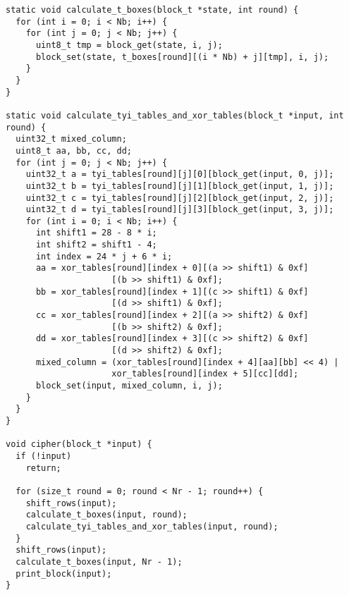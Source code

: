 \documentclass[a4paper, 10pt]{article}
\begin{document}
  \scriptsize{
    \begin{verbatim}
static void calculate_t_boxes(block_t *state, int round) {
  for (int i = 0; i < Nb; i++) {
    for (int j = 0; j < Nb; j++) {
      uint8_t tmp = block_get(state, i, j);
      block_set(state, t_boxes[round][(i * Nb) + j][tmp], i, j);
    }
  }
}

static void calculate_tyi_tables_and_xor_tables(block_t *input, int round) {
  uint32_t mixed_column;
  uint8_t aa, bb, cc, dd;
  for (int j = 0; j < Nb; j++) {
    uint32_t a = tyi_tables[round][j][0][block_get(input, 0, j)];
    uint32_t b = tyi_tables[round][j][1][block_get(input, 1, j)];
    uint32_t c = tyi_tables[round][j][2][block_get(input, 2, j)];
    uint32_t d = tyi_tables[round][j][3][block_get(input, 3, j)];
    for (int i = 0; i < Nb; i++) {
      int shift1 = 28 - 8 * i;
      int shift2 = shift1 - 4;
      int index = 24 * j + 6 * i;
      aa = xor_tables[round][index + 0][(a >> shift1) & 0xf]
                     [(b >> shift1) & 0xf];
      bb = xor_tables[round][index + 1][(c >> shift1) & 0xf]
                     [(d >> shift1) & 0xf];
      cc = xor_tables[round][index + 2][(a >> shift2) & 0xf]
                     [(b >> shift2) & 0xf];
      dd = xor_tables[round][index + 3][(c >> shift2) & 0xf]
                     [(d >> shift2) & 0xf];
      mixed_column = (xor_tables[round][index + 4][aa][bb] << 4) |
                     xor_tables[round][index + 5][cc][dd];
      block_set(input, mixed_column, i, j);
    }
  }
}

void cipher(block_t *input) {
  if (!input)
    return;

  for (size_t round = 0; round < Nr - 1; round++) {
    shift_rows(input);
    calculate_t_boxes(input, round);
    calculate_tyi_tables_and_xor_tables(input, round);
  }
  shift_rows(input);
  calculate_t_boxes(input, Nr - 1);
  print_block(input);
}

\end{verbatim}
}
\end{document}
